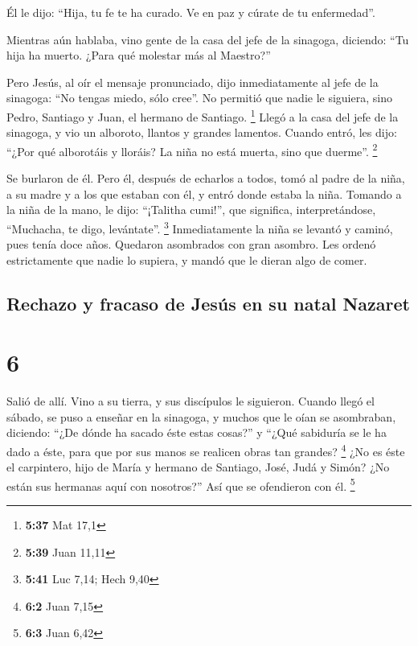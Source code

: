  Él le dijo: ``Hija, tu fe te ha curado. Ve en paz y
cúrate de tu enfermedad''.

 Mientras aún hablaba, vino gente de la casa del jefe de
la sinagoga, diciendo: ``Tu hija ha muerto. ¿Para qué molestar más al
Maestro?''

 Pero Jesús, al oír el mensaje pronunciado, dijo
inmediatamente al jefe de la sinagoga: ``No tengas miedo, sólo cree''.
 No permitió que nadie le siguiera, sino Pedro, Santiago
y Juan, el hermano de Santiago. \footnote{\textbf{5:37} Mat 17,1}
 Llegó a la casa del jefe de la sinagoga, y vio un
alboroto, llantos y grandes lamentos.  Cuando entró, les
dijo: ``¿Por qué alborotáis y lloráis? La niña no está muerta, sino que
duerme''. \footnote{\textbf{5:39} Juan 11,11}

 Se burlaron de él. Pero él, después de echarlos a todos,
tomó al padre de la niña, a su madre y a los que estaban con él, y entró
donde estaba la niña.  Tomando a la niña de la mano, le
dijo: ``¡Talitha cumi!'', que significa, interpretándose, ``Muchacha, te
digo, levántate''. \footnote{\textbf{5:41} Luc 7,14; Hech 9,40}
 Inmediatamente la niña se levantó y caminó, pues tenía
doce años. Quedaron asombrados con gran asombro.  Les
ordenó estrictamente que nadie lo supiera, y mandó que le dieran algo de
comer.

\hypertarget{rechazo-y-fracaso-de-jesuxfas-en-su-natal-nazaret}{%
\subsection{Rechazo y fracaso de Jesús en su natal
Nazaret}\label{rechazo-y-fracaso-de-jesuxfas-en-su-natal-nazaret}}

\hypertarget{section-5}{%
\section{6}\label{section-5}}

 Salió de allí. Vino a su tierra, y sus discípulos le
siguieron.  Cuando llegó el sábado, se puso a enseñar en
la sinagoga, y muchos que le oían se asombraban, diciendo: ``¿De dónde
ha sacado éste estas cosas?'' y ``¿Qué sabiduría se le ha dado a éste,
para que por sus manos se realicen obras tan grandes? \footnote{\textbf{6:2}
  Juan 7,15}  ¿No es éste el carpintero, hijo de María y
hermano de Santiago, José, Judá y Simón? ¿No están sus hermanas aquí con
nosotros?'' Así que se ofendieron con él. \footnote{\textbf{6:3} Juan
  6,42}


